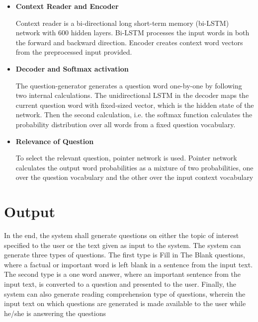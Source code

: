 \begin{itemize}

	\item \textbf{Context Reader and Encoder}

Context reader is a bi-directional long short-term memory (bi-LSTM) network with
		600 hidden layers. Bi-LSTM processes the input words in both the
		forward and backward direction. Encoder creates context word
		vectors from the preprocessed input provided.

\item \textbf{Decoder and Softmax activation}

	The question-generator generates a question word one-by-one by following
		two internal calculations. The unidirectional LSTM in the
		decoder maps the current question word with fixed-sized vector,
		which is the hidden state of the network. Then the second
		calculation, i.e. the softmax function calculates the
		probability distribution over all words from a fixed question
		vocabulary.

\item \textbf{Relevance of Question}

	To select the relevant question, pointer network is used. Pointer
		network calculates the output word probabilities as a mixture of
		two probabilities, one over the question vocabulary and the
		other over the input context vocabulary

\end{itemize}

\section{Output}

In the end, the system shall generate questions on either the topic of interest
specified to the user or the text given as input to the system. The system can
generate three types of questions. The first type is Fill in The Blank
questions, where a factual or important word is left blank in a sentence from
the input text. The second type is a one word answer, where an important
sentence from the input text, is converted to a question and presented to the
user. Finally, the system can also generate reading comprehension type of
questions, wherein the input text on which questions are generated is made
available to the user while he/she is answering the questions


